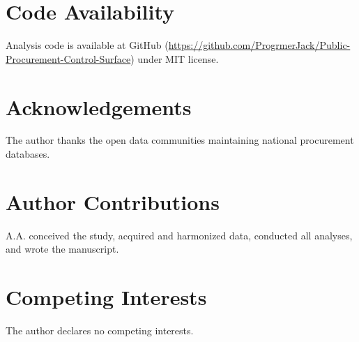 \documentclass[11pt,a4paper]{article}
\begin{document}
\section{Code Availability}

Analysis code is available at GitHub (\url{https://github.com/ProgrmerJack/Public-Procurement-Control-Surface}) under MIT license.

\section*{Acknowledgements}

The author thanks the open data communities maintaining national procurement databases.

\section*{Author Contributions}

A.A. conceived the study, acquired and harmonized data, conducted all analyses, and wrote the manuscript.

\section*{Competing Interests}

The author declares no competing interests.
\end{document}
